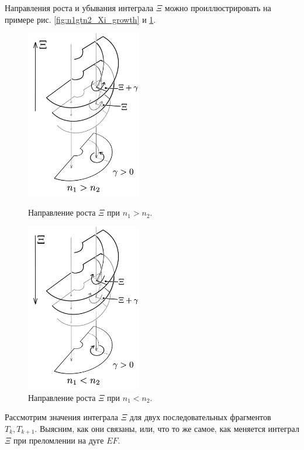 Направления роста и убывания интеграла $\Xi$ можно проиллюстрировать на примере рис. \ref{fig:n1gtn2_Xi_growth} и \ref{fig:n1ltn2_Xi_growth}.
\begin{figure}[!htb]
\centering
\includegraphics[width=5cm]{images/ch4/section3_circular/n1gtn2.png}
    \caption{Направление роста $\Xi$ при $n_1 > n_2$.}
    \label{fig:n1gtn2_Xi_growth}
\endminipage\hfill
{}
\centering
\includegraphics[width=5cm]{images/ch4/section3_circular/n1ltn2.png}
    \caption{Направление роста $\Xi$ при $n_1 < n_2$.}
    \label{fig:n1ltn2_Xi_growth}
\endminipage\hfill
\end{figure}

Рассмотрим значения интеграла $\Xi$ для двух последовательных фрагментов $T_k, T_{k+1}$. Выясним, как они связаны, или, что то же самое, как меняется интеграл $\Xi$ при преломлении на дуге $EF$. 

